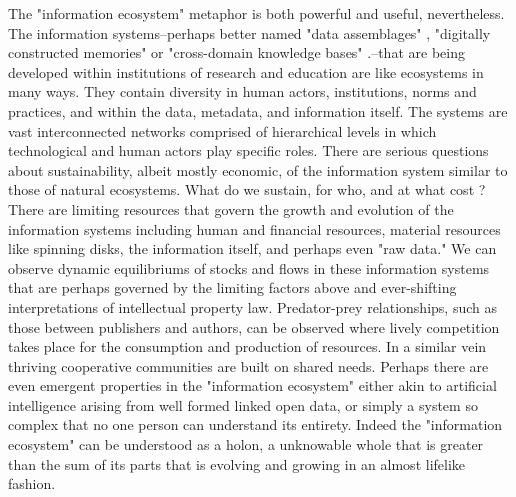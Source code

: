 The "information ecosystem" metaphor is both powerful and useful, nevertheless. The information systems--perhaps better named "data assemblages" \cite{kitchin_2014}, "digitally constructed memories" or "cross-domain knowledge bases" \cite{baker_2007}.--that are being developed within institutions of research and education are like ecosystems in many ways. They contain diversity in human actors, institutions, norms and practices, and within the data, metadata, and information itself. The systems are vast interconnected networks comprised of hierarchical levels in which technological and human actors play specific roles. There are serious questions about sustainability, albeit mostly economic, of the information system similar to those of natural ecosystems. What do we sustain, for who, and at what cost \cite[cf.][especially ch. 10)]{liverman_2004, kitchin_2014}? There are limiting resources that govern the growth and evolution of the information systems including human and financial resources, material resources like spinning disks, the information itself, and perhaps even "raw data." We can observe dynamic equilibriums of stocks and flows in these information systems that are perhaps governed by the limiting factors above and ever-shifting interpretations of intellectual property law. Predator-prey relationships, such as those between publishers and authors, can be observed where lively competition takes place for the consumption and production of resources. In a similar vein thriving cooperative communities are built on shared needs. Perhaps there are even emergent properties in the "information ecosystem" either akin to artificial intelligence arising from well formed linked open data, or simply a system so complex that no one person can understand its entirety. Indeed the "information ecosystem" can be understood as a holon, a unknowable whole that is greater than the sum of its parts that is evolving and growing in an almost lifelike fashion. 

